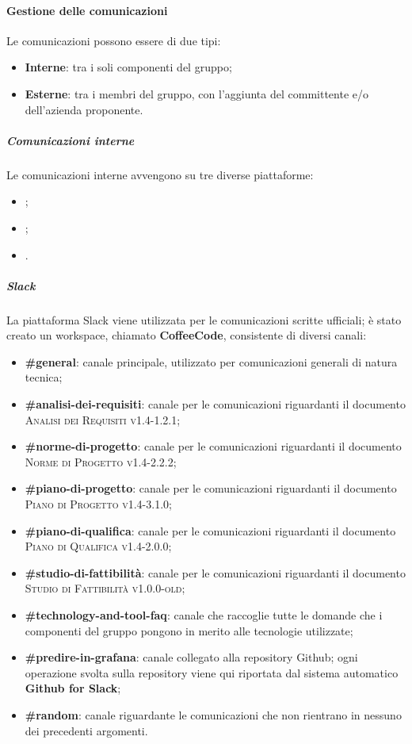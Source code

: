 \documentclass[../norme-di-progetto.tex]{subfiles}
\begin{document}
\paragraph{Gestione delle comunicazioni}
Le comunicazioni possono essere di due tipi:
\begin{itemize}
  \item \textbf{Interne}: tra i soli componenti del gruppo;
  \item \textbf{Esterne}: tra i membri del gruppo, con l'aggiunta del committente e/o dell'azienda proponente.
\end{itemize}
\subparagraph{Comunicazioni interne}
Le comunicazioni interne avvengono su tre diverse piattaforme:
\begin{itemize}
  \item {};
  \item {};
  \item {}.
\end{itemize}
\subparagraph*{Slack}
La piattaforma Slack viene utilizzata per le comunicazioni scritte ufficiali; è stato creato un workspace, chiamato \textbf{CoffeeCode}, consistente di diversi canali:
\begin{itemize}
  \item \textbf{\#general}: canale principale, utilizzato per comunicazioni generali di natura tecnica;
  \item \textbf{\#analisi-dei-requisiti}: canale per le comunicazioni riguardanti il documento \textsc{Analisi dei Requisiti v1.4-1.2.1};
  \item \textbf{\#norme-di-progetto}: canale per le comunicazioni riguardanti il documento \textsc{Norme di Progetto v1.4-2.2.2};
  \item \textbf{\#piano-di-progetto}: canale per le comunicazioni riguardanti il documento \textsc{Piano di Progetto v1.4-3.1.0};
  \item \textbf{\#piano-di-qualifica}: canale per le comunicazioni riguardanti il documento \textsc{Piano di Qualifica v1.4-2.0.0};
  \item \textbf{\#studio-di-fattibilità}: canale per le comunicazioni riguardanti il documento \textsc{Studio di Fattibilità v1.0.0-old};
  \item \textbf{\#technology-and-tool-faq}: canale che raccoglie tutte le domande che i componenti del gruppo pongono in merito alle tecnologie utilizzate;
  \item \textbf{\#predire-in-grafana}: canale collegato alla repository Github; ogni operazione svolta sulla repository viene qui riportata dal sistema automatico \textbf{Github for Slack};
  \item \textbf{\#random}: canale riguardante le comunicazioni che non rientrano in nessuno dei precedenti argomenti.
\end{itemize}
\end{document}
